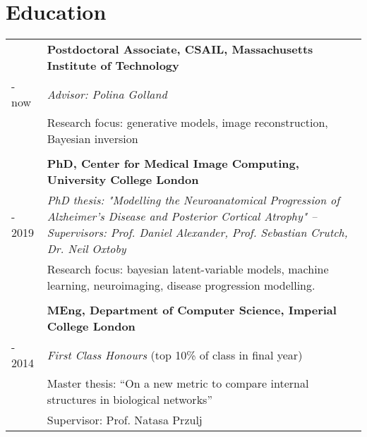 \documentclass[a4paper,10pt]{article} %
\begin{document}
\vspace{-0.5em}

\section*{Education}


\begin{tabular}{>{\raggedleft\arraybackslash} p{0.93cm}|p{15.7cm}}
2019 & \large\textbf{Postdoctoral Associate, CSAIL, Massachusetts Institute of Technology} \\
- now & \emph{Advisor: Polina Golland}\\
& Research focus: generative models, image reconstruction, Bayesian inversion\\

&\\

2014 & \large\textbf{PhD, Center for Medical Image Computing, University College London}\\
- 2019 & \emph{PhD thesis: "Modelling the Neuroanatomical Progression of
Alzheimer’s Disease and Posterior Cortical Atrophy" -- \small Supervisors: Prof. Daniel Alexander, Prof. Sebastian Crutch, Dr. Neil Oxtoby}\\

& Research focus: bayesian latent-variable models, machine learning, neuroimaging, disease progression modelling.\\

\\
2010 & \large\textbf{MEng, Department of  Computer Science, Imperial College London}\\
- 2014 & \emph{First Class Honours} (top 10\% of class in final year) \\
& Master thesis: ``On a new metric to compare internal structures in biological
networks''\\
& \small Supervisor: Prof. Natasa Przulj\\
\end{tabular}
\end{document}
